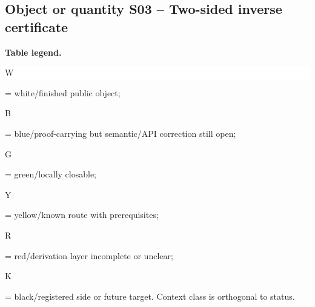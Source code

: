 \subsection*{Object or quantity S03 -- Two-sided inverse certificate}
\hypertarget{objproof:S03}{}
\par\smallskip\noindent\begin{minipage}{0.99\linewidth}\footnotesize\raggedright\textbf{Table legend.} \colorbox{white}{\strut W} = white/finished public object; \colorbox{cyan!20}{\strut B} = blue/proof-carrying but semantic/API correction still open; \colorbox{green!18}{\strut G} = green/locally closable; \colorbox{yellow!25}{\strut Y} = yellow/known route with prerequisites; \colorbox{red!20}{\strut R} = red/derivation layer incomplete or unclear; \colorbox{black!18}{\strut K} = black/registered side or future target. Context class is orthogonal to status.\end{minipage}\par\vspace{0.25em}
